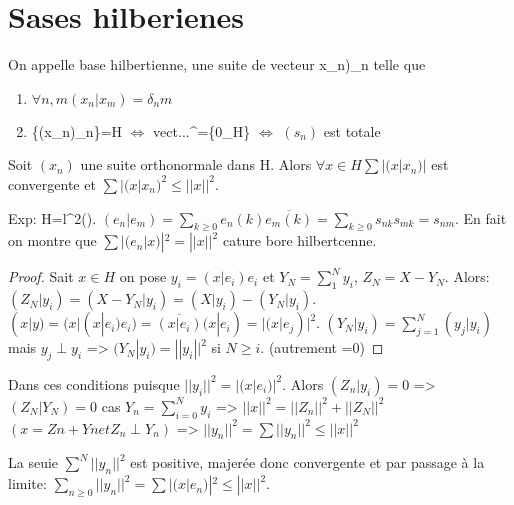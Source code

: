 \section{Sases hilberienes} %
\ifcomment

\begin{definition}
	On appelle base hilbertienne, une suite de vecteur x_n)_{n\in \N} telle que 
	\begin{enumerate}
		\item $\forall n,m (x_n|x_m)=δ_nm$
		\item \vect\{(x_n)_n\in\N\}=H $\Leftrightarrow$ vect{...}^\perp=\{0_H\} $\Leftrightarrow$ $(s_n)$ est totale
	\end{enumerate}
\end{definition}

\begin{theoreme}
	Soit $(x_n)$ une suite orthonormale dans H. Alors $\forall x\in H ∑|(x|x_n)|$ est convergente et $∑|(x|x_n)^2≤||x||^2$.
\end{theoreme}

Exp: H=l^2(\N). $(e_n|e_m)=∑_{k≥0}e_n(k)\overline{e_m(k)}=∑_{k≥0}s_{nk}s_{mk}=s_{nm}$. En fait on montre que $∑|(e_n|x)|^2=||x||^2$ cature bore hilbertcenne.
\begin{proof}
	Sait $x\in H$ on pose $y_i=(x|e_i)e_i$ et $Y_N=∑_1^Ny_i$, $Z_N=X-Y_N$. Alors: $(Z_N|y_i)=(X-Y_N|y_i)=(X|y_i)-(Y_N|y_i)$. $(x|y)=(x|(x|e_i)e_i)=\overline{(x|e_i)}(x|e_i)=|(x|e_j)|^2$. $(Y_N|y_i)=∑_{j=1}^N(y_j|y_i)$ mais $y_j\perp y_i$ => $(Y_N|y_i) =||y_i||^2$ si $N≥i$.
	(autrement =0)
\end{proof}

Dans ces conditions puisque $||y_i||^2=|(x|e_i)|^2$. Alors $(Z_n|y_i)=0$ => $(Z_N|Y_N)=0$ cas $Y_n=∑_{i=0}^Ny_i$ => $||x||^2=||Z_n||^2+||Z_N||^2$ $(x=Zn+Yn et Z_n\perp Y_n)$
=> $||y_n||^2=∑||y_n||^2≤||x||^2$

La seuie $∑^N||y_n||^2$ est positive, majerée donc convergente et par passage à la limite: $∑_{n≥0}||y_n||^2=∑|(x|e_n)|^2≤||x||^2$.

